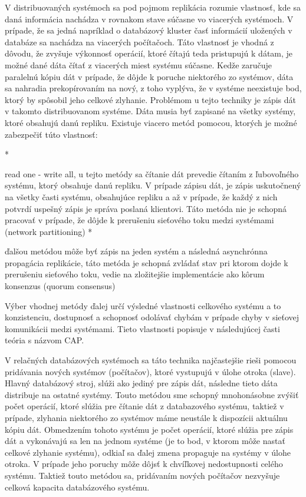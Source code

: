 \documentclass[11pt,twoside,a4paper]{book}
\begin{document}
V distribuovaných systémoch sa pod pojmom replikácia rozumie vlastnosť, kde sa daná informácia nachádza v rovnakom stave súčasne vo viacerých systémoch. V prípade, že sa jedná napríklad o databázový kluster časť informácií uložených v databáze sa nachádza na viacerých počítačoch. Táto vlastnosť je vhodná z dôvodu, že zvyšuje výkonnosť operácií, ktoré čítajú teda pristupujú k dátam, je možné dané dáta čítať z viacerých miest systému súčasne. Kedže zaručuje paralelnú kópiu dát v prípade, že dôjde k poruche niektorého zo systémov, dáta sa nahradia prekopírovaním na nový, z toho vyplýva, že v systéme neexistuje bod, ktorý by spôsobil jeho celkové zlyhanie. Problémom u tejto techniky je zápis dát v takomto distribuovanom systéme. Dáta musia byť zapisané na všetky systémy, ktoré obsahujú danú repliku. Existuje viacero metód pomocou, ktorých je možné zabezpečiť túto vlastnosť:

    *

      read one - write all, u tejto metódy sa čítanie dát prevedie čítaním z ľubovoľného systému, ktorý obsahuje danú repliku. V prípade zápisu dát, je zápis uskutočnený na všetky časti systému, obsahujúce repliku a až v prípade, že každý z nich potvrdí uspešný zápis je správa poslaná klientovi. Táto metóda nie je schopná pracovať v prípade, že dôjde k prerušeniu sieťového toku medzi systémami (network partitioning)
    *

      ďalšou metódou môže byť zápis na jeden systém a následná asynchrónna propagácia replikácie, táto metóda je schopná zvládať stav pri ktorom dojde k prerušeniu sieťového toku, vedie na zložitejšie implementácie ako kôrum konsenzus (quorum consensus)

Výber vhodnej metódy ďalej určí výsledné vlastnosti celkového systému a to konzistenciu, dostupnosť a schopnosť odolávať chybám v prípade chyby v sieťovej komunikácii medzi systémami. Tieto vlastnosti popisuje v následujúcej časti teória s názvom CAP.

V relačných databázových systémoch sa táto technika najčastejšie rieši pomocou pridávania nových systémov (počítačov), ktoré vystupujú v úlohe otroka (slave). Hlavný databázový stroj, slúži ako jediný pre zápis dát, následne tieto dáta distribuje na ostatné systémy. Touto metódou sme schopný mnohonásobne zvýšiť počet operácií, ktoré slúžia pre čítanie dát z databazového systému, taktiež v prípade, zlyhania niektorého zo systémov máme neustále k dispozícii aktuálnu kópiu dát. Obmedzením tohoto systému je počet operácií, ktoré slúžia pre zápis dát a vykonávajú sa len na jednom systéme (je to bod, v ktorom môže nastať celkové zlyhanie systému), odkiaľ sa ďalej zmena propaguje na systémy v úlohe otroka. V prípade jeho poruchy môže dôjsť k chvíľkovej nedostupnosti celého systému. Taktiež touto metódou sa, pridávaním nových počítačov nezvyšuje celková kapacita databázového systému.
\end{document}
